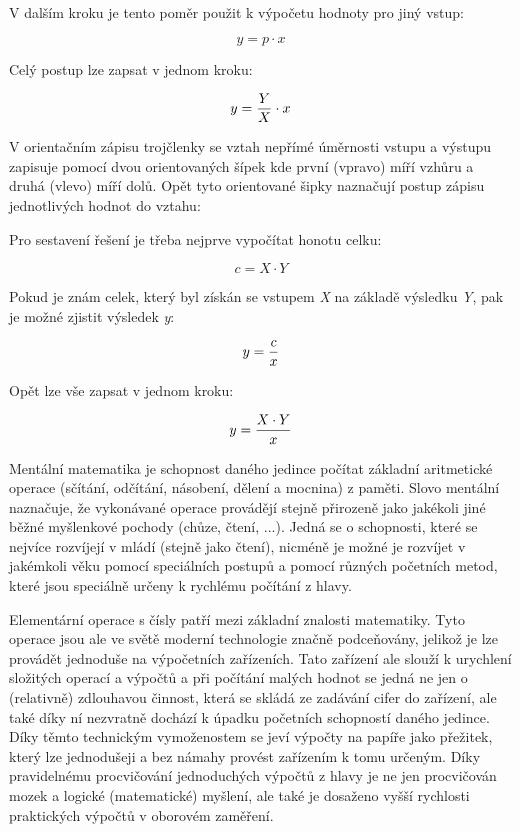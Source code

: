 V dalším kroku je tento poměr použit k výpočetu hodnoty pro jiný vstup:

$$ y =  p \cdot x $$

Celý postup lze zapsat v jednom kroku:

$$ y = {Y\over X} \cdot x $$


V orientačním zápisu trojčlenky se vztah nepřímé úměrnosti vstupu a výstupu zapisuje pomocí dvou orientovaných šípek kde první (vpravo) míří vzhůru a druhá (vlevo) míří dolů. Opět tyto orientované šipky naznačují postup zápisu jednotlivých hodnot do vztahu:

\vskip 4mm
\centerline{}
\vskip 4mm

Pro sestavení řešení je třeba nejprve vypočítat honotu celku:

$$ c = X \cdot Y $$


Pokud je znám celek, který byl získán se vstupem {\it X} na základě výsledku {\it Y}, pak je možné zjistit výsledek {\it y}:

$$ y = {c \over x} $$

Opět lze vše zapsat v jednom kroku:

$$ y = {{X \cdot Y}\over x} $$


Mentální matematika je schopnost daného jedince počítat základní aritmetické operace (sčítání, odčítání, násobení, dělení a mocnina) z paměti. Slovo mentální naznačuje, že vykonávané operace provádějí stejně přirozeně jako jakékoli jiné běžné myšlenkové pochody (chůze, čtení, ...). Jedná se o schopnosti, které se nejvíce rozvíjejí v mládí (stejně jako čtení), nicméně je možné je rozvíjet v jakémkoli věku pomocí speciálních postupů a pomocí různých početních metod, které jsou speciálně určeny k rychlému počítání z hlavy.

Elementární operace s čísly patří mezi základní znalosti matematiky. Tyto operace jsou ale ve světě moderní technologie značně podceňovány, jelikož je lze provádět jednoduše na výpočetních zařízeních. Tato zařízení ale slouží k urychlení složitých operací a výpočtů a při počítání malých hodnot se jedná ne jen o (relativně) zdlouhavou činnost, která se skládá ze zadávání cifer do zařízení, ale také díky ní nezvratně dochází k úpadku početních schopností daného jedince. Díky těmto technickým vymoženostem se jeví výpočty na papíře jako přežitek, který lze jednodušeji a bez námahy provést zařízením k tomu určeným. Díky pravidelnému procvičování jednoduchých výpočtů z hlavy je ne jen procvičován mozek a logické (matematické) myšlení, ale také je dosaženo vyšší rychlosti praktických výpočtů v oborovém zaměření.

